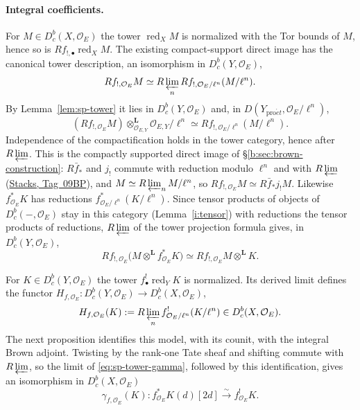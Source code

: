 \documentclass[11pt,a4paper]{article}
\numberwithin{equation}{section}
\theoremstyle{definition}
\theoremstyle{remark}
\newcommand{\Dbc}{D^b_c}
\newcommand{\proet}{\mathrm{pro}\acute{e}t}
\newcommand{\stacks}[1]{\href{https://stacks.math.columbia.edu/tag/#1}{\textnormal{Stacks, Tag~#1}}}
\begin{document}
\paragraph{Integral coefficients.}
For $M\in\Dbc(X,\mathcal O_E)$ the tower
$\operatorname{red}_XM$ is normalized with the Tor bounds of $M$, hence
so is $Rf_{!,\bullet}\operatorname{red}_XM$. The existing
compact-support direct image has the canonical tower description, an
isomorphism in $\Dbc(Y,\mathcal O_E)$,
\begin{equation}\label{eq:sp-integral-F}
 Rf_{!,\mathcal O_E}M\simeq
 R\varprojlim_n Rf_{!,\mathcal O_E/\ell^n}(M/\ell^n).
\end{equation}
By Lemma~\ref{lem:sp-tower} it lies in $\Dbc(Y,\mathcal O_E)$
and, in $D(Y_{\proet},\mathcal O_E/\ell^n)$,
\begin{equation}\label{eq:sp-F-reduction}
 (Rf_{!,\mathcal O_E}M)\otimes^{\mathbf L}_{\mathcal O_{E,Y}}\mathcal O_{E,Y}/\ell^n
      \simeq Rf_{!,\mathcal O_E/\ell^n}(M/\ell^n).
\end{equation}
Independence of the compactification holds in the tower category,
hence after $R\varprojlim$. This is the compactly supported direct image
of \S\ref{b:sec:brown-construction}: $R\bar f_*$ and $j_!$ commute with
reduction modulo $\ell^n$ and with $R\varprojlim$ (\stacks{09BP}), and
$M\simeq R\varprojlim_nM/\ell^n$, so
$Rf_{!,\mathcal O_E}M\simeq R\bar f_*j_!M$. Likewise
$f_{\mathcal O_E}^{*}K$ has reductions
$f_{\mathcal O_E/\ell^n}^*(K/\ell^n)$. Since tensor products of objects
of $\Dbc(-,\mathcal O_E)$ stay in this category (Lemma~\ref{i:tensor}) with reductions the tensor products of reductions,
$R\varprojlim$ of the tower projection formula gives, in
$\Dbc(Y,\mathcal O_E)$,
\[
 Rf_{!,\mathcal O_E}\bigl(M\otimes^{\mathbf L} f_{\mathcal O_E}^{*}K\bigr)
 \simeq Rf_{!,\mathcal O_E}M\otimes^{\mathbf L} K.
\]

For $K\in\Dbc(Y,\mathcal O_E)$ the tower
$f_\bullet^!\operatorname{red}_YK$ is normalized. Its derived limit defines the functor
$H_{f,\mathcal O_E}\colon\Dbc(Y,\mathcal O_E)\to\Dbc(X,\mathcal O_E)$,
\begin{equation}\label{eq:sp-integral-H}
 H_{f,\mathcal O_E}(K):=
 R\varprojlim_n f_{\mathcal O_E/\ell^n}^!(K/\ell^n)
 \in\Dbc(X,\mathcal O_E).
\end{equation}
The next proposition identifies this model, with its counit, with
the integral Brown adjoint. Twisting by the rank-one Tate sheaf and
shifting commute with $R\varprojlim$, so the limit of
\eqref{eq:sp-tower-gamma}, followed by this identification, gives
an isomorphism in $\Dbc(X,\mathcal O_E)$
\begin{equation}\label{eq:sp-integral-gamma-O}
 \gamma_{f,\mathcal O_E}(K):
 f_{\mathcal O_E}^{*}K(d)[2d]
      \xrightarrow{\sim}f_{\mathcal O_E}^!K.
\end{equation}
\end{document}

